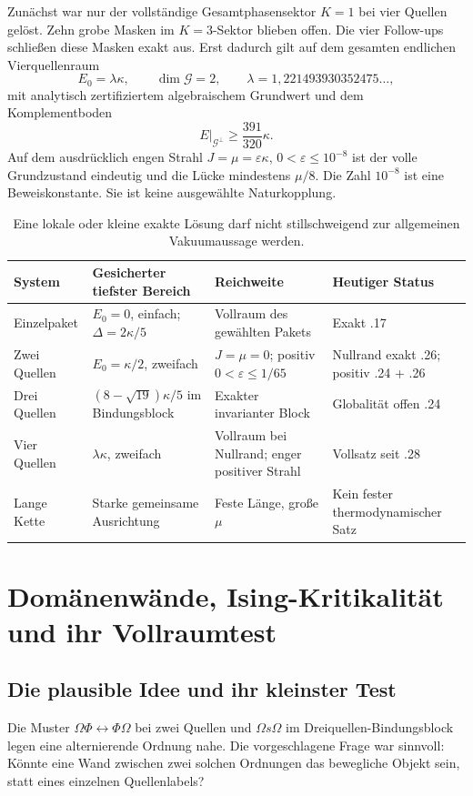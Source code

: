 Zunächst war nur der vollständige Gesamtphasensektor $K=1$ bei vier Quellen gelöst. Zehn grobe Masken im $K=3$-Sektor blieben offen. Die vier Follow-ups schließen diese Masken exakt aus. Erst dadurch gilt auf dem gesamten endlichen Vierquellenraum
\[
 E_0=\lambda\kappa,\qquad\dim\mathcal G=2,\qquad
 \lambda=1{,}221493930352475\ldots,
\]
mit analytisch zertifiziertem algebraischem Grundwert und dem Komplementboden
\[
 E\big|_{\mathcal G^\perp}\ge\frac{391}{320}\kappa.
\]
Auf dem ausdrücklich engen Strahl $J=\mu=\varepsilon\kappa$, $0<\varepsilon\le10^{-8}$ ist der volle Grundzustand eindeutig und die Lücke mindestens $\mu/8$. Die Zahl $10^{-8}$ ist eine Beweiskonstante. Sie ist keine ausgewählte Naturkopplung. 

\begin{table}[ht]
\centering\small
\begin{tabularx}{\textwidth}{@{}lYYY@{}}
\toprule
System & Gesicherter tiefster Bereich & Reichweite & Heutiger Status\\\midrule
Einzelpaket & $E_0=0$, einfach; $\Delta=2\kappa/5$ & Vollraum des gewählten Pakets & Exakt .17\\
Zwei Quellen & $E_0=\kappa/2$, zweifach & $J=\mu=0$; positiv $0<\varepsilon\le1/65$ & Nullrand exakt .26; positiv .24 + .26\\
Drei Quellen & $(8-\sqrt{19})\kappa/5$ im Bindungsblock & Exakter invarianter Block & Globalität offen .24\\
Vier Quellen & $\lambda\kappa$, zweifach & Vollraum bei Nullrand; enger positiver Strahl & Vollsatz seit .28\\
Lange Kette & Starke gemeinsame Ausrichtung & Feste Länge, große $\mu$ & Kein fester thermodynamischer Satz\\\bottomrule
\end{tabularx}
\caption{Eine lokale oder kleine exakte Lösung darf nicht stillschweigend zur allgemeinen Vakuumaussage werden.}
\end{table}

\chapter{Domänenwände, Ising-Kritikalität und ihr Vollraumtest}
\section{Die plausible Idee und ihr kleinster Test}
Die Muster $\Omega\Phi\leftrightarrow\Phi\Omega$ bei zwei Quellen und $\Omega s\Omega$ im Dreiquellen-Bindungsblock legen eine alternierende Ordnung nahe. Die vorgeschlagene Frage war sinnvoll: Könnte eine Wand zwischen zwei solchen Ordnungen das bewegliche Objekt sein, statt eines einzelnen Quellenlabels?

